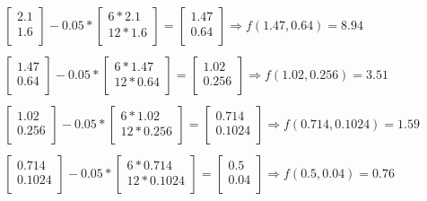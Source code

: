  \begin{align*}
    \begin{bmatrix}
      2.1\\
      1.6\\
    \end{bmatrix} - 0.05 * \begin{bmatrix}
      6 * 2.1\\
      12 * 1.6\\
    \end{bmatrix} = \begin{bmatrix}
      1.47\\
      0.64\\
    \end{bmatrix} \Rightarrow f(1.47, 0.64) = 8.94
    \\\\
    \begin{bmatrix}
      1.47\\
      0.64\\
    \end{bmatrix} - 0.05 * \begin{bmatrix}
      6 * 1.47\\
      12 * 0.64\\
    \end{bmatrix} = \begin{bmatrix}
      1.02\\
      0.256\\
    \end{bmatrix} \Rightarrow f(1.02, 0.256) = 3.51
    \\\\
    \begin{bmatrix}
      1.02\\
      0.256\\
    \end{bmatrix} - 0.05 * \begin{bmatrix}
      6 * 1.02\\
      12 * 0.256\\
    \end{bmatrix} = \begin{bmatrix}
      0.714\\
      0.1024\\
    \end{bmatrix} \Rightarrow f(0.714, 0.1024) = 1.59
    \\\\
    \begin{bmatrix}
      0.714\\
      0.1024\\
    \end{bmatrix} - 0.05 * \begin{bmatrix}
      6 * 0.714\\
      12 * 0.1024\\
    \end{bmatrix} = \begin{bmatrix}
      0.5\\
      0.04\\
    \end{bmatrix} \Rightarrow f(0.5, 0.04) = 0.76
    \\\\
  \end{align*}
